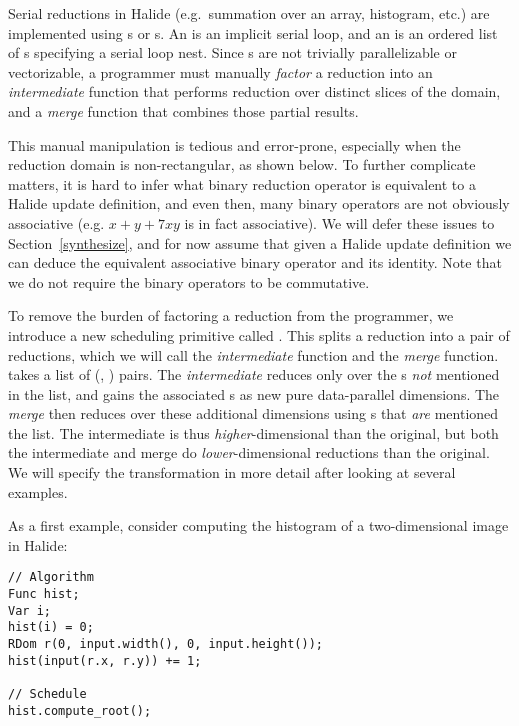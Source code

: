 
Serial reductions in Halide (e.g.\ summation over an array, histogram, etc.) are implemented using s or s. An  is an implicit serial loop, and an  is an ordered list of s specifying a serial loop nest. Since s are not trivially parallelizable or vectorizable, a programmer must manually \emph{factor} a reduction into an \emph{intermediate} function that performs reduction over distinct slices of the domain, and a \emph{merge} function that combines those partial results.

This manual manipulation is tedious and error-prone, especially when the reduction domain is non-rectangular, as shown below. To further complicate matters, it is hard to infer what binary reduction operator is equivalent to a Halide update definition, and even then, many binary operators are not obviously associative (e.g. $x + y + 7xy$ is in fact associative). We will defer these issues to Section~\ref{synthesize}, and for now assume that given a Halide update definition we can deduce the equivalent associative binary operator and its identity. Note that we do not require the binary operators to be commutative.

To remove the burden of factoring a reduction from the programmer, we introduce a new scheduling primitive called . This splits a reduction into a pair of reductions, which we will call the \emph{intermediate} function and the \emph{merge} function.  takes a list of (, ) pairs. The \emph{intermediate} reduces only over the s \emph{not} mentioned in the list, and gains the associated s as new pure data-parallel dimensions. The \emph{merge} then reduces over these additional dimensions using s that \emph{are} mentioned the list. The intermediate is thus \emph{higher}-dimensional than the original, but both the intermediate and merge do \emph{lower}-dimensional reductions than the original. We will specify the transformation in more detail after looking at several examples.

As a first example, consider computing the histogram of a two-dimensional image in Halide:

\begin{lstlisting}
// Algorithm
Func hist;
Var i;
hist(i) = 0;
RDom r(0, input.width(), 0, input.height());
hist(input(r.x, r.y)) += 1;

// Schedule
hist.compute_root();
\end{lstlisting}

